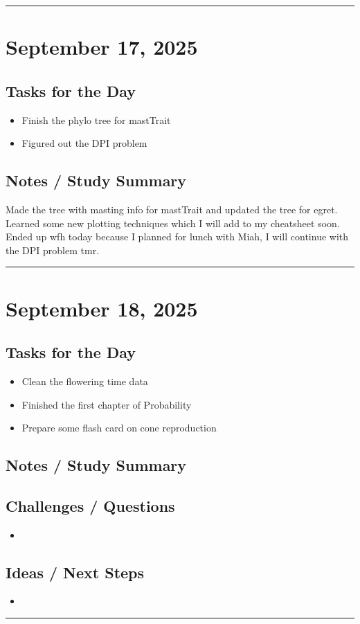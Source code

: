 \documentclass[12pt]{article}
\begin{document}
\vspace{1em}
\hrule
\vspace{1em}

\section*{September 17, 2025}

\subsection*{Tasks for the Day}
\begin{itemize}
    \item Finish the phylo tree for mastTrait
    \item Figured out the DPI problem
\end{itemize}
\subsection*{Notes / Study Summary}
Made the tree with masting info for mastTrait and updated the tree for egret. Learned some new plotting techniques which I will add to my cheatsheet soon.\\
Ended up wfh today because I planned for lunch with Miah, I will continue with the DPI problem tmr.

\vspace{1em}
\hrule
\vspace{1em}

\section*{September 18, 2025}

\subsection*{Tasks for the Day}
\begin{itemize}
    \item Clean the flowering time data
    \item Finished the first chapter of Probability
    \item Prepare some flash card on cone reproduction
\end{itemize}
\subsection*{Notes / Study Summary}

\subsection*{Challenges / Questions}
\begin{itemize}
    \item 
\end{itemize}

\subsection*{Ideas / Next Steps}
\begin{itemize}
    \item 
\end{itemize}

\vspace{1em}
\hrule
\vspace{1em}
\end{document}
